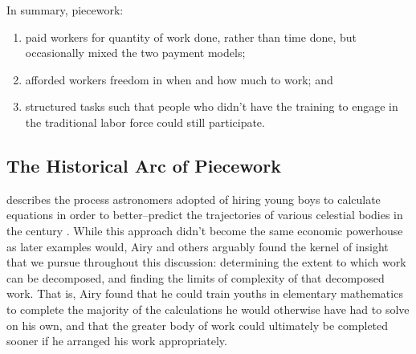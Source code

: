 \documentclass[trackingWork]{subfiles}
\begin{document}

In summary, piecework:
\begin{enumerate}
  \item paid workers for quantity of work done, rather than time done, but occasionally mixed the two payment models;
  \item afforded workers freedom in when and how much to work; and
  \item structured tasks such that people who didn't have the training to engage in the traditional labor force could still participate.
\end{enumerate}

\subsection{The Historical Arc of Piecework}\label{sec:pieceworkArc}

\citeauthor{grier2013computers} describes the process astronomers adopted of hiring young boys
to calculate equations in order
to better--predict the trajectories of various celestial bodies in the  century
\cite{grier2013computers}.
While this approach didn't become the same economic powerhouse as later examples would,
Airy  and others arguably found the kernel of insight that we pursue throughout this discussion:
determining the extent to which work can be decomposed, and
finding the limits of complexity of that decomposed work.
That is, Airy found that he could train youths in elementary mathematics
to complete the majority of the calculations he would otherwise have had to solve on his own,
and that the greater body of work could ultimately be completed sooner
if he arranged his work appropriately.
\end{document}
